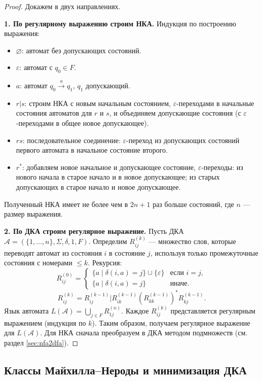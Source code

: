 \documentclass[12pt,a4paper]{article}
\theoremstyle{definition}
\newcommand{\emptystring}{\varepsilon}
\newcommand{\A}{\mathcal{A}}
\begin{document}
\begin{proof}
Докажем в двух направлениях.

\textbf{1. По регулярному выражению строим НКА.}
Индукция по построению выражения:
\begin{itemize}
\item $\varnothing$: автомат без допускающих состояний.
\item $\emptystring$: автомат с $q_0\in F$.
\item $a$: автомат $q_0\xrightarrow{a} q_1$, $q_1$ допускающий.
\item $r|s$: строим НКА с новым начальным состоянием, $\emptystring$-переходами в начальные состояния автоматов для $r$ и $s$, и объединяем допускающие состояния (с $\emptystring$-переходами в общее новое допускающее).
\item $rs$: последовательное соединение: $\emptystring$-переход из допускающих состояний первого автомата в начальное состояние второго.
\item $r^*$: добавляем новое начальное и допускающее состояние, $\emptystring$-переходы: из нового начала в старое начало и в новое допускающее; из старых допускающих в старое начало и новое допускающее.
\end{itemize}
Полученный НКА имеет не более чем в $2n+1$ раз больше состояний, где $n$ --- размер выражения.

\textbf{2. По ДКА строим регулярное выражение.}
Пусть ДКА $\A = (\{1,\dots,n\},\Sigma,\delta,1,F)$. Определим $R_{ij}^{(k)}$ --- множество слов, которые переводят автомат из состояния $i$ в состояние $j$, используя только промежуточные состояния с номерами $\le k$. Рекурсия:
\[
R_{ij}^{(0)} = 
\begin{cases}
\{a\mid \delta(i,a)=j\} \cup \{\emptystring\} & \text{если } i=j,\\
\{a\mid \delta(i,a)=j\} & \text{иначе}.
\end{cases}
\]
\[
R_{ij}^{(k)} = R_{ij}^{(k-1)} | R_{ik}^{(k-1)} (R_{kk}^{(k-1)})^* R_{kj}^{(k-1)}.
\]
Язык автомата $L(\A) = \bigcup_{j\in F} R_{1j}^{(n)}$. Каждое $R_{ij}^{(k)}$ представляется регулярным выражением (индукция по $k$). Таким образом, получаем регулярное выражение для $L(\A)$. Для НКА сначала преобразуем в ДКА методом подмножеств (см. раздел \ref{sec:nfa2dfa}).
\end{proof}

\subsection{Классы Майхилла–Нероды и минимизация ДКА}
\end{document}

